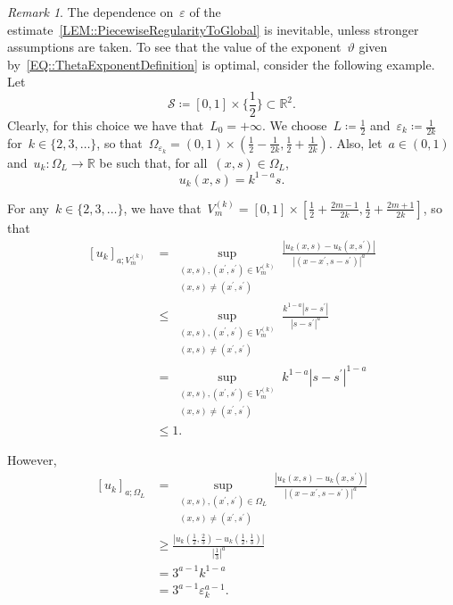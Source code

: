 \documentclass[12pt,a4paper]{amsart}
\numberwithin{equation}{section}
\theoremstyle{definition}
\theoremstyle{remark}
\newtheorem{remark}[theorem]{Remark}
\newcommand{\R}{\mathbb{R}}
\newcommand{\eps}{\varepsilon}
\newcommand{\abs}[1]{\left\lvert#1\right\rvert}
\renewcommand{\leq}{\leqslant}
\renewcommand{\geq}{\geqslant}
\begin{document}
\begin{remark}\label{REM::Counterexample}
    The dependence on~$\eps$ of the estimate~\eqref{LEM::PiecewiseRegularityToGlobal} is inevitable, unless stronger assumptions are taken. To see that the value of the exponent~$\vartheta$ given by~\eqref{EQ::ThetaExponentDefinition} is optimal, consider the following example. Let
    \[\mathcal{S} \coloneq [0,1] \times \bigg\{\frac{1}{2}\bigg\} \subset \R^2.\]
    Clearly, for this choice we have that~$L_0 = +\infty$. We choose~$L \coloneq \frac{1}{2}$ and~$\eps_k \coloneq \frac{1}{2k}$ for~$k \in \{2,3,\dots\}$, so that~$\Omega_{\eps_k} = (0,1) \times (\frac{1}{2}-\frac{1}{2k},\frac{1}{2}+\frac{1}{2k})$. Also, let~$a \in (0,1)$ and~$u_k \colon \Omega_L \to \R$ be such that, for all~$(x,s) \in \Omega_L$,
    \[u_k(x,s) = k^{1-a}s.\]
    
    For any~$k \in \{2,3,\dots\}$, we have that~$V_m^{(k)} = [0,1] \times [\frac{1}{2}+\frac{2m-1}{2k},\frac{1}{2}+\frac{2m+1}{2k}]$, so that
    \begin{equation}\label{EQ::CounterexampleSmallDomain}
        \begin{split}
            {[u_k]}_{a; V_m^{(k)}} &= \sup_{\substack{(x,s),(x^\prime,s^\prime) \in V_m^{(k)}\\(x,s)\neq(x^\prime,s^\prime)}} \frac{\abs{u_k(x,s)-u_k(x,s^\prime)}}{\abs{(x-x^\prime, s-s^\prime)}^a} \\
                &\leq \sup_{\substack{(x,s),(x^\prime,s^\prime) \in V_m^{(k)}\\(x,s)\neq(x^\prime,s^\prime)}} \frac{k^{1-a}\abs{s-s^\prime}}{\abs{s-s^\prime}^a}\\
                & = \sup_{\substack{(x,s),(x^\prime,s^\prime) \in V_m^{(k)}\\(x,s)\neq(x^\prime,s^\prime)}} k^{1-a}\abs{s-s^\prime}^{1-a}\\
                &\leq 1.
        \end{split}
    \end{equation}

    However,
    \begin{equation}\label{EQ::CounterexampleBigDomain}
        \begin{split}
            {[u_k]}_{a; \Omega_L} &= \sup_{\substack{(x,s),(x^\prime,s^\prime) \in \Omega_L\\(x,s)\neq(x^\prime,s^\prime)}} \frac{\abs{u_k(x,s)-u_k(x,s^\prime)}}{\abs{(x-x^\prime, s-s^\prime)}^a}\\
                &\geq \frac{\abs{u_k(\frac{1}{2}, \frac{2}{3})- u_k(\frac{1}{2}, \frac{1}{3})}}{\abs{\frac{1}{3}}^a}\\
                &= 3^{a-1}k^{1-a}\\
                &= 3^{a-1}\eps_k^{a-1}. 
        \end{split}
    \end{equation}


\end{remark}
\end{document}

